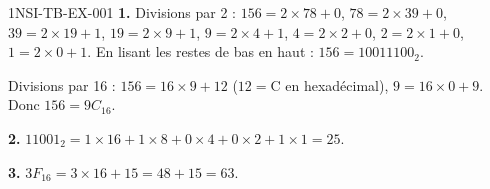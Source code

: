 \begin{corrige}{1NSI-TB-EX-001}
\textbf{1.} Divisions par 2 : $156=2\times78+0$, $78=2\times39+0$, $39=2\times19+1$,
$19=2\times9+1$, $9=2\times4+1$, $4=2\times2+0$, $2=2\times1+0$, $1=2\times0+1$. En lisant
les restes de bas en haut : $156=10011100_2$.

Divisions par 16 : $156=16\times9+12$ ($12=$C en hexadécimal), $9=16\times0+9$. Donc
$156=9C_{16}$.

\textbf{2.} $11001_2=1\times16+1\times8+0\times4+0\times2+1\times1=25$.

\textbf{3.} $3F_{16}=3\times16+15=48+15=63$.
\end{corrige}
